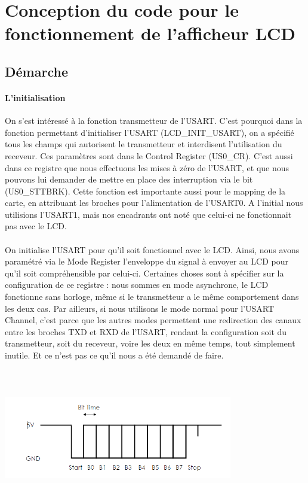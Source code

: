 \documentclass[a4paper]{report}
\begin{document}
	\section{Conception du code pour le fonctionnement de l'afficheur LCD}

		\subsection{Démarche}
				\paragraph{L'initialisation}
					On s'est intéressé à la fonction transmetteur de l'USART. C'est pourquoi dans la fonction permettant d'initialiser l'USART (LCD\_INIT\_USART), on a spécifié tous les champs qui autorisent le transmetteur et interdisent l'utilisation du receveur. Ces paramètres sont dans le Control Register (US0\_CR). C'est aussi dans ce registre que nous effectuons les mises à zéro de l'USART, et que nous pouvons lui demander de mettre en place des interruption via le bit (US0\_STTBRK).
					Cette fonction est importante aussi pour le mapping de la carte, en attribuant les broches pour l'alimentation de l'USART0. A l'initial nous utilisions l'USART1, mais nos encadrants ont noté que celui-ci ne fonctionnait pas avec le LCD.

				\paragraph{}
					On initialise l'USART pour qu'il soit fonctionnel avec le LCD. Ainsi, nous avons paramétré via le Mode Register l'enveloppe du signal à envoyer au LCD pour qu'il soit compréhensible par celui-ci. Certaines choses sont à spécifier sur la configuration de ce registre : nous sommes en mode asynchrone, le LCD fonctionne sans horloge, même si le transmetteur a le même comportement dans les deux cas. Par ailleurs, si nous utilisons le mode normal pour l'USART Channel, c'est parce que les autres modes permettent une redirection des canaux entre les broches TXD et RXD de l'USART, rendant la configuration soit du transmetteur, soit du receveur, voire les deux en même temps, tout simplement inutile. Et ce n'est pas ce qu'il nous a été demandé de faire.

					\includegraphics[width=10cm,height=6cm]{images/signauxLCD.png}
\end{document}
